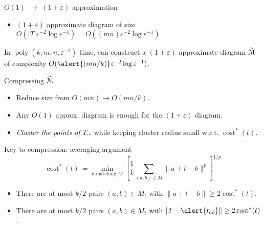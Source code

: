 \documentclass[xcolor={dvipsnames,usenames},handout]{beamer} %
\newcommand{\eps}{\varepsilon}
\DeclareMathOperator{\poly}{poly}
\def\abs#1{\mathopen| #1 \mathclose|}		%
\def\norm#1{\mathopen\| #1 \mathclose\|}	%
\DeclareMathOperator{\cost}{cost}
\newcommand{\tildeM}{\widetilde{\EuScript{M}}}
\def\EMPH#1{\textcolor{BrickRed}{{\emph{#1}}}}
\begin{document}
\begin{frame}{$O(1)$ $\rightarrow$ $(1+\eps)$ approximation}
\begin{itemize}
\item $(1+\eps)$ approximate diagram of size
	$O(\abs{T}\eps^{-2}\log\eps^{-1}) = O((mn)\eps^{-2}\log\eps^{-1})$
\end{itemize}
\begin{theorem}
In $\poly(k, m, n, \eps^{-1})$ time, can construct a $(1+\eps)$ approximate
diagram $\tildeM$ of complexity $O(\alert{(mn/k)}\eps^{-2}\log\eps^{-1})$.
\end{theorem}
\end{frame}

\begin{frame}{Compressing $\tildeM$}
\begin{itemize}
\item Reduce size from $O(mn) \rightarrow O(mn/k)$.
\item Any $O(1)$ approx. diagram is enough for the $(1+\eps)$ diagram.
\item \EMPH{Cluster the points of $T$}\ldots
	while keeping cluster radius small w.r.t. $\cost^*(t)$.
\end{itemize}
\end{frame}

\begin{frame}{Key to compression: averaging argument}
\begin{equation*}
\cost^*(t) \coloneqq \min_{\text{$k$-matching $M$}} \left[\frac{1}{k}\sum_{(a, b) \in M}\norm{a+t-b}^p\right]^{1/p}
\end{equation*}
\begin{itemize}
\item There are at most $k/2$ pairs $(a, b) \in M_t$ with $\norm{a+t-b} \geq 2\cost^*(t)$.
\item There are at most $k/2$ pairs $(a, b) \in M_t$ with $\norm{t-\alert{t_{ab}}} \geq 2\cost^*(t)$.
\end{itemize}
\end{frame}
\end{document}
